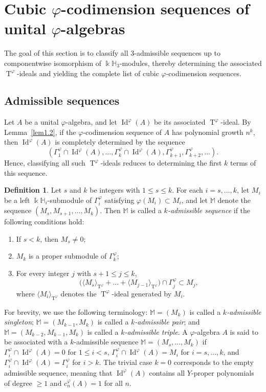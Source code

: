 \documentclass{amsart}
\theoremstyle{definition}
\newtheorem{Def}[thm]{Definition}
\theoremstyle{remark}
\numberwithin{equation}{section}
\def \Ga{\Gamma}
\def \vp{\varphi}
\def \k{\Bbbk}
\def \H{\mathbb{H}}
\def \M{\mathbb{M}}
\def \Id{\operatorname{Id}}
\def \T{\operatorname{T}}
\begin{document}
\section{Cubic $\vp$-codimension sequences of unital $\vp$-algebras} \label{sec2}
	The goal of this section is to classify all $3$-admissible sequences up to componentwise isomorphism of $\k\H_3$-modules, thereby determining the associated $\T^\vp$-ideals and yielding the complete list of cubic $\vp$-codimension sequences.

\subsection{Admissible sequences}
	Let $A$ be a unital $\vp$-algebra, and let $\Id^\vp(A)$ be its associated $\T^\vp$-ideal. By Lemma~\ref{lem1.2}, if the $\vp$-codimension sequence of $A$ has polynomial growth $n^k$, then $\Id^\vp(A)$ is completely determined by the sequence
	\[
	(\Ga_1^\vp \cap \Id^\vp(A), \dots, \Ga_k^\vp \cap \Id^\vp(A), \Ga_{k+1}^\vp, \Ga_{k+2}^\vp, \dots).
	\]
	Hence, classifying all such $\T^\vp$-ideals reduces to determining the first $k$ terms of this sequence.
	
\begin{Def}\label{def2.1}
	Let $s$ and $k$ be integers with $1 \leq s \leq k$. For each $i = s, \dots, k$, let $M_i$ be a left $\k\H_i$-submodule of $\Ga_i^\vp$ satisfying $\vp(M_i) \subset M_i$, and let $\M$ denote the sequence $(M_s, M_{s+1}, \dots, M_k)$. Then $\M$ is called a \emph{$k$-admissible sequence} if the following conditions hold:
	\begin{enumerate}
		\item[(1)] If $s < k$, then $M_s \neq 0$;
		\item[(2)] $M_k$ is a proper submodule of $\Ga_k^\vp$;
		\item[(3)] For every integer $j$ with $s+1 \leq j \leq k$,
		\[
		\bigl( \langle M_s \rangle_{\T^\vp} + \dots + \langle M_{j-1} \rangle_{\T^\vp} \bigr) \cap \Ga_j^\vp \subset M_j,
		\]
		where $\langle M_i \rangle_{\T^\vp}$ denotes the $\T^\vp$-ideal generated by $M_i$.
	\end{enumerate}
	For brevity, we use the following terminology: $\M = (M_k)$ is called a \emph{$k$-admissible singleton}; $\M = (M_{k-1}, M_k)$ is called a \emph{$k$-admissible pair}; and $\M = (M_{k-2}, M_{k-1}, M_k)$ is called a \emph{$k$-admissible triple}. A $\vp$-algebra $A$ is said to be associated with a $k$-admissible sequence $\M=(M_s,\dots,M_k)$ if $\Ga_i^\vp \cap \Id^\vp(A) = 0$ for $1 \le i < s$, $\Ga_i^\vp \cap \Id^\vp(A) = M_i$ for $i=s,\dots,k$, and $\Ga_i^\vp \cap \Id^\vp(A) = \Ga_i^\vp$ for $i>k$. The trivial case $k=0$ corresponds to the empty admissible sequence, meaning that $\Id^\vp(A)$ contains all $Y$-proper polynomials of degree $\ge 1$ and $c_n^\vp(A)=1$ for all $n$.
\end{Def}
\end{document}
